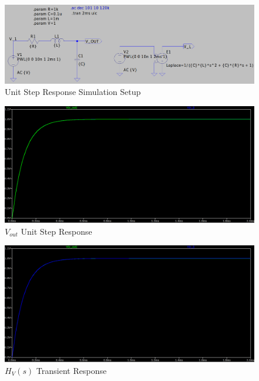 \begin{figure}[h]
    \centering
    \includegraphics[width=1\textwidth, height=0.4\textheight]{assets/rlc-unit-step-sim.png}
    \caption{Unit Step Response Simulation Setup}
    \label{fig:unit_step_response}
\end{figure}

\newpage
\thispagestyle{plain}

\begin{figure}[h]
    \centering
    \includegraphics[width=1\textwidth]{assets/rlc-unit-step-sim-v-out.png}
    \caption{$V_{out}$ Unit Step Response}
    \label{fig:rlc_v_out_unit_step_response}
\end{figure}

\begin{figure}[h]
    \centering
    \includegraphics[width=1\textwidth]{assets/rlc-unit-step-sim-v-laplace.png}
    \caption{$H_{V}(s)$ Transient Response}
    \label{fig:rlc_v_laplace_unit_step_response}
\end{figure}

